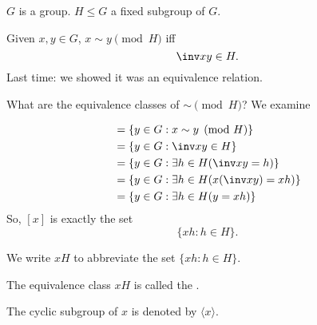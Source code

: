 \documentclass[notes.tex]{subfiles}
\begin{document}


$G$ is a group. $H \le G$ a fixed subgroup of $G$.

Given $x, y\in G$, $x\sim y \pmod H$ iff \[
	\inv xy\in H.
\]
Last time: we showed it was an equivalence relation.

What are the equivalence classes of $\sim\pmod H$?
We examine 

\begin{align*}
	[x] &= \{y\in G: x\sim y\pmod H\}\\
	&= \{y\in G : \inv xy\in H\}\\
	&= \{y\in G : \exists h \in H (\inv x y = h)\}\\
	&= \{y\in G : \exists h\in H (x(\inv xy)=xh)\}\\
	&= \{y\in G : \exists h \in H (y = xh)\}
\end{align*}
So, $[x]$ is exactly the set \[
	\{xh:h\in H\}.
\]
\begin{notation}
	We write $xH$ to abbreviate the set $\{xh:h\in H\}$.
\end{notation}

\begin{definition}
	The equivalence class $xH$ is called the .
\end{definition}

\begin{notation}
	The cyclic subgroup of $x$ is denoted by $\langle x\rangle$.
\end{notation}
\end{document}
